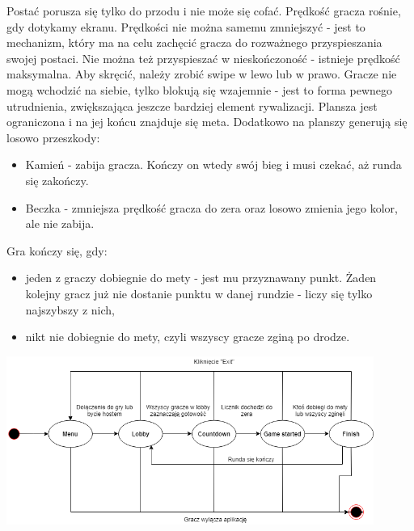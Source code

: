 \documentclass[]{report}
\begin{document}
Postać porusza się tylko do przodu i nie może się cofać. Prędkość gracza rośnie, gdy dotykamy ekranu. Prędkości nie można samemu zmniejszyć - jest to mechanizm, który ma na celu zachęcić gracza do rozważnego przyspieszania swojej postaci. Nie można też przyspieszać w nieskończoność - istnieje prędkość maksymalna. Aby skręcić, należy zrobić swipe w lewo lub w prawo. Gracze nie mogą wchodzić na siebie, tylko blokują się wzajemnie - jest to forma pewnego utrudnienia, zwiększająca jeszcze bardziej element rywalizacji. Plansza jest ograniczona i na jej końcu znajduje się meta. Dodatkowo na planszy generują się losowo przeszkody:
\begin{itemize}
	\item Kamień - zabija gracza. Kończy on wtedy swój bieg i musi czekać, aż runda się zakończy.
	\item Beczka - zmniejsza prędkość gracza do zera oraz losowo zmienia jego kolor, ale nie zabija.
\end{itemize}
Gra kończy się, gdy:
\begin{itemize}
	\item jeden z graczy dobiegnie do mety - jest mu przyznawany punkt. Żaden kolejny gracz już nie dostanie punktu w danej rundzie - liczy się tylko najszybszy z nich,
	\item nikt nie dobiegnie do mety, czyli wszyscy gracze zginą po drodze.
\end{itemize}
\begin{center}
	\includegraphics[width=0.9\textwidth]{game_cycle.png}
\end{center}
\end{document}
